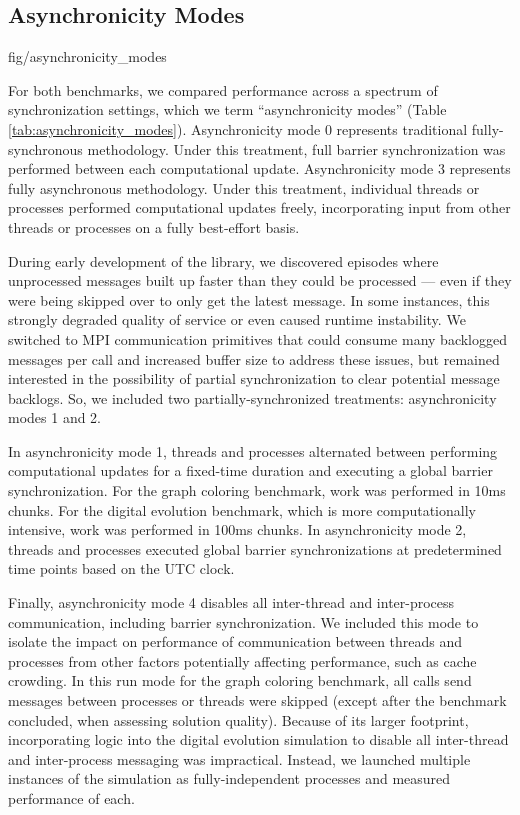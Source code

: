 \subsection{Asynchronicity Modes} \label{sec:asynchronicity_modes}

{fig/asynchronicity_modes}

For both benchmarks, we compared performance across a spectrum of synchronization settings, which we term ``asynchronicity modes'' (Table \ref{tab:asynchronicity_modes}).
Asynchronicity mode 0 represents traditional fully-synchronous methodology.
Under this treatment, full barrier synchronization was performed between each computational update.
Asynchronicity mode 3 represents fully asynchronous methodology.
Under this treatment, individual threads or processes performed computational updates freely, incorporating input from other threads or processes on a fully best-effort basis.

During early development of the library, we discovered episodes where unprocessed messages built up faster than they could be processed --- even if they were being skipped over to only get the latest message.
In some instances, this strongly degraded  quality of service or even caused runtime instability.
We switched to MPI communication primitives that could consume many backlogged messages per call and increased buffer size to address these issues, but remained interested in the possibility of partial synchronization to clear potential message backlogs.
So, we included two partially-synchronized treatments: asynchronicity modes 1 and 2.

In asynchronicity mode 1, threads and processes alternated between performing computational updates for a fixed-time duration and executing a global barrier synchronization.
For the graph coloring benchmark, work was performed in 10ms chunks.
For the digital evolution benchmark, which is more computationally intensive, work was performed in 100ms chunks.
In asynchronicity mode 2, threads and processes executed global barrier synchronizations at predetermined time points based on the UTC clock.

Finally, asynchronicity mode 4 disables all inter-thread and inter-process communication, including barrier synchronization.
We included this mode to isolate the impact on performance of communication between threads and processes from other factors potentially affecting performance, such as cache crowding.
In this run mode for the graph coloring benchmark, all calls send messages between processes or threads were skipped (except after the benchmark concluded, when assessing solution quality).
Because of its larger footprint, incorporating logic into the digital evolution simulation to disable all inter-thread and inter-process messaging was impractical.
Instead, we launched multiple instances of the simulation as fully-independent processes and measured performance of each.
